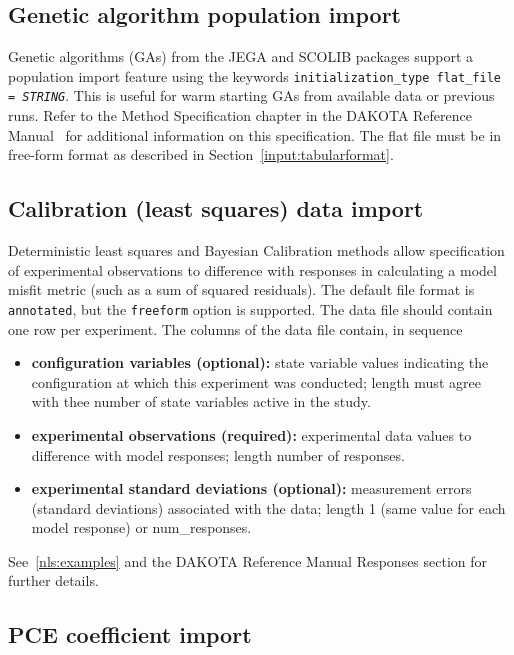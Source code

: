 \subsection{Genetic algorithm population import}

Genetic algorithms (GAs) from the JEGA and SCOLIB packages support a
population import feature using the keywords
\texttt{initialization\_type flat\_file = \emph{STRING}}.  This is
useful for warm starting GAs from available data or previous runs.
Refer to the Method Specification chapter in the DAKOTA Reference
Manual~\cite{RefMan} for additional information on this specification.
The flat file must be in free-form format as described in
Section~\ref{input:tabularformat}.

\subsection{Calibration (least squares) data import}

Deterministic least squares and Bayesian Calibration methods allow
specification of experimental observations to difference with
responses in calculating a model misfit metric (such as a sum of
squared residuals).  The default file format is {\tt annotated}, but
the {\tt freeform} option is supported.  The data file should contain
one row per experiment.   The columns of the data file contain, in sequence
\begin{itemize}
\item {\bf configuration variables (optional):} state variable values
  indicating the configuration at which this experiment was conducted;
  length must agree with thee number of state variables active in the
  study.
\item {\bf experimental observations (required):} experimental data
  values to difference with model responses; length number of
  responses.
\item {\bf experimental standard deviations (optional):} measurement
  errors (standard deviations) associated with the data; length 1
  (same value for each model response) or num\_responses.
\end{itemize}
See~\ref{nls:examples} and the DAKOTA Reference Manual Responses
section for further details.

\subsection{PCE coefficient import}

